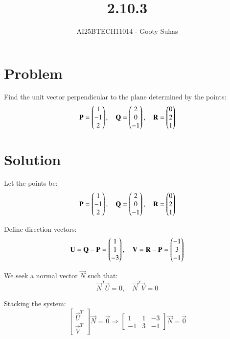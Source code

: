 \documentclass[journal]{IEEEtran}
\begin{document}

\vspace{3cm}

\title{2.10.3}
\author{AI25BTECH11014 - Gooty Suhas}
{\let\newpage\relax\maketitle}

\renewcommand{\thefigure}{\theenumi}
\renewcommand{\thetable}{\theenumi}
\setlength{\intextsep}{10pt}
\renewcommand{\thetable}{\theenumi}

\section*{\large\textbf{Problem}}

Find the unit vector perpendicular to the plane determined by the points:
\[
\mathbf{P} = \begin{pmatrix}1 \\ -1 \\ 2\end{pmatrix}, \quad
\mathbf{Q} = \begin{pmatrix}2 \\ 0 \\ -1\end{pmatrix}, \quad
\mathbf{R} = \begin{pmatrix}0 \\ 2 \\ 1\end{pmatrix}
\]

\section*{\large\textbf{Solution}}

Let the points be:
\[
\mathbf{P} = \begin{pmatrix}1 \\ -1 \\ 2\end{pmatrix}, \quad
\mathbf{Q} = \begin{pmatrix}2 \\ 0 \\ -1\end{pmatrix}, \quad
\mathbf{R} = \begin{pmatrix}0 \\ 2 \\ 1\end{pmatrix}
\]

Define direction vectors:
\[
\mathbf{U} = \mathbf{Q} - \mathbf{P} = \begin{pmatrix}1 \\ 1 \\ -3\end{pmatrix}, \quad
\mathbf{V} = \mathbf{R} - \mathbf{P} = \begin{pmatrix}-1 \\ 3 \\ -1\end{pmatrix}
\]

We seek a normal vector \( \vec{N} \) such that:
\[
\vec{N}^T \vec{U} = 0, \quad \vec{N}^T \vec{V} = 0
\]

Stacking the system:
\[
\begin{bmatrix}
\vec{U}^T \\
\vec{V}^T
\end{bmatrix}
\vec{N} = \vec{0}
\Rightarrow
\begin{bmatrix}
1 & 1 & -3 \\
-1 & 3 & -1
\end{bmatrix}
\vec{N} = \vec{0}
\]
\end{document}
